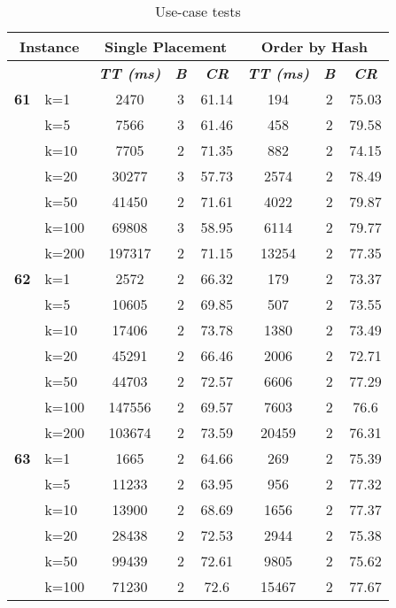    \begin{table}[htbp]
    \caption{Use-case tests}
    \centering
    \begin{tabular}{|l|l|c|c|c|c|c|c|}
    
    \multicolumn{ 2}{|c|}{\textbf{Instance}} & \multicolumn{ 3}{c|}{\textbf{Single Placement}} & \multicolumn{ 3}{c|}{\textbf{Order by Hash}} \\ \hline
    \multicolumn{ 2}{|l|}{} & \textbf{\textit{TT (ms)}} & \textbf{\textit{B}} & \textbf{\textit{CR}} & \textbf{\textit{TT (ms)}} & \textbf{\textit{B}} & \textbf{\textit{CR}} \\ \hline
    \multicolumn{1}{|r|}{\textbf{61}} & k=1 & 2470 & 3 & 61.14 & 194 & 2 & 75.03 \\ 
     & k=5 & 7566 & 3 & 61.46 & 458 & 2 & 79.58 \\ 
     & k=10 & 7705 & 2 & 71.35 & 882 & 2 & 74.15 \\ 
     & k=20 & 30277 & 3 & 57.73 & 2574 & 2 & 78.49 \\ 
     & k=50 & 41450 & 2 & 71.61 & 4022 & 2 & 79.87 \\ 
     & k=100 & 69808 & 3 & 58.95 & 6114 & 2 & 79.77 \\ 
     & k=200 & 197317 & 2 & 71.15 & 13254 & 2 & 77.35 \\ \hline
    \multicolumn{1}{|r|}{\textbf{62}} & k=1 & 2572 & 2 & 66.32 & 179 & 2 & 73.37 \\ 
     & k=5 & 10605 & 2 & 69.85 & 507 & 2 & 73.55 \\ 
     & k=10 & 17406 & 2 & 73.78 & 1380 & 2 & 73.49 \\ 
     & k=20 & 45291 & 2 & 66.46 & 2006 & 2 & 72.71 \\ 
     & k=50 & 44703 & 2 & 72.57 & 6606 & 2 & 77.29 \\ 
     & k=100 & 147556 & 2 & 69.57 & 7603 & 2 & 76.6 \\ 
     & k=200 & 103674 & 2 & 73.59 & 20459 & 2 & 76.31 \\ \hline
    \multicolumn{1}{|r|}{\textbf{63}} & k=1 & 1665 & 2 & 64.66 & 269 & 2 & 75.39 \\ 
     & k=5 & 11233 & 2 & 63.95 & 956 & 2 & 77.32 \\ 
     & k=10 & 13900 & 2 & 68.69 & 1656 & 2 & 77.37 \\ 
     & k=20 & 28438 & 2 & 72.53 & 2944 & 2 & 75.38 \\ 
     & k=50 & 99439 & 2 & 72.61 & 9805 & 2 & 75.62 \\ 
     & k=100 & 71230 & 2 & 72.6 & 15467 & 2 & 77.67 \\ 

\end{tabular}
\end{table}
